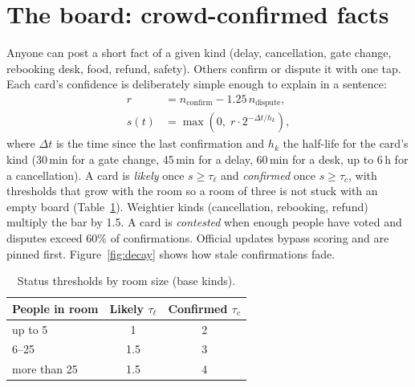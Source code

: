 \documentclass[10pt,twocolumn]{article}
\begin{document}
\section{The board: crowd-confirmed facts}\label{sec:board}
Anyone can post a short fact of a given kind (delay, cancellation, gate change, rebooking desk, food, refund, safety).
Others confirm or dispute it with one tap. Each card's confidence is deliberately simple enough to explain in a
sentence:
\begin{align}
  r &= n_{\text{confirm}} - 1.25\, n_{\text{dispute}}, \\
  s(t) &= \max\!\left(0,\; r \cdot 2^{-\Delta t / h_k}\right),
\end{align}
where $\Delta t$ is the time since the last confirmation and $h_k$ the half-life for the card's kind (30\,min for a gate
change, 45\,min for a delay, 60\,min for a desk, up to 6\,h for a cancellation). A card is \emph{likely} once
$s \ge \tau_\ell$ and \emph{confirmed} once $s \ge \tau_c$, with thresholds that grow with the room so a room of three is
not stuck with an empty board (Table~\ref{tab:thr}). Weightier kinds (cancellation, rebooking, refund) multiply the
bar by 1.5. A card is \emph{contested} when enough people have voted and disputes exceed 60\% of confirmations.
Official updates bypass scoring and are pinned first. Figure~\ref{fig:decay} shows how stale confirmations fade.

\begin{table}[h]
\centering\small
\caption{Status thresholds by room size (base kinds).}
\label{tab:thr}
\begin{tabular}{@{}lcc@{}}
\toprule
\textbf{People in room} & \textbf{Likely} $\tau_\ell$ & \textbf{Confirmed} $\tau_c$ \\
\midrule
up to 5 & 1 & 2 \\
6--25 & 1.5 & 3 \\
more than 25 & 1.5 & 4 \\
\bottomrule
\end{tabular}
\end{table}
\end{document}
